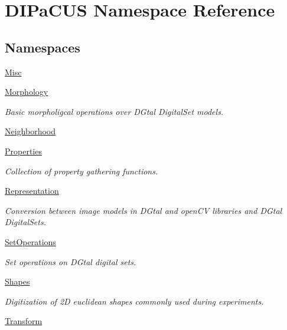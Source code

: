 \hypertarget{namespaceDIPaCUS}{}\section{D\+I\+Pa\+C\+US Namespace Reference}
\label{namespaceDIPaCUS}
\subsection*{Namespaces}
\begin{DoxyCompactItemize}
\item 
 \hyperlink{namespaceDIPaCUS_1_1Misc}{Misc}
\item 
 \hyperlink{namespaceDIPaCUS_1_1Morphology}{Morphology}
\begin{DoxyCompactList}\small\item\em Basic morpholigcal operations over D\+Gtal Digital\+Set models. \end{DoxyCompactList}\item 
 \hyperlink{namespaceDIPaCUS_1_1Neighborhood}{Neighborhood}
\item 
 \hyperlink{namespaceDIPaCUS_1_1Properties}{Properties}
\begin{DoxyCompactList}\small\item\em Collection of property gathering functions. \end{DoxyCompactList}\item 
 \hyperlink{namespaceDIPaCUS_1_1Representation}{Representation}
\begin{DoxyCompactList}\small\item\em Conversion between image models in D\+Gtal and open\+CV libraries and D\+Gtal Digital\+Sets. \end{DoxyCompactList}\item 
 \hyperlink{namespaceDIPaCUS_1_1SetOperations}{Set\+Operations}
\begin{DoxyCompactList}\small\item\em Set operations on D\+Gtal digital sets. \end{DoxyCompactList}\item 
 \hyperlink{namespaceDIPaCUS_1_1Shapes}{Shapes}
\begin{DoxyCompactList}\small\item\em Digitization of 2D euclidean shapes commonly used during experiments. \end{DoxyCompactList}\item 
 \hyperlink{namespaceDIPaCUS_1_1Transform}{Transform}
\end{DoxyCompactItemize}
